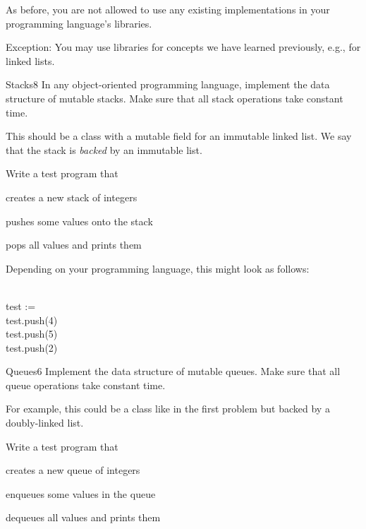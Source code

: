 \documentclass[a4paper]{article}
\begin{document}
\header

As before, you are not allowed to use any existing implementations in your programming language's libraries.

Exception: You may use libraries for concepts we have learned previously, e.g., for linked lists.

\begin{problem}{Stacks}{8}
In any object-oriented programming language, implement the data structure of mutable stacks.
Make sure that all stack operations take constant time.

This should be a class with a mutable field for an immutable linked list.
We say that the stack is \emph{backed} by an immutable list.

Write a test program that
\begin{compactitem}
 \item creates a new stack of integers
 \item pushes some values onto the stack
 \item pops all values and prints them
\end{compactitem}

Depending on your programming language, this might look as follows:
\begin{acode}
\\
test := \\
test.push(4)\\
test.push(5)\\
test.push(2)\\
\end{acode}

\end{problem}

\begin{problem}{Queues}{6}
Implement the data structure of mutable queues.
Make sure that all queue operations take constant time.

For example, this could be a class like in the first problem but backed by a doubly-linked list.

Write a test program that
\begin{compactitem}
 \item creates a new queue of integers
 \item enqueues some values in the queue
 \item dequeues all values and prints them
\end{compactitem}
\end{problem}
\end{document}

